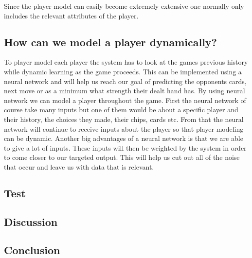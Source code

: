 Since the player model can easily become extremely extensive one normally only includes the relevant attributes of the player.

\subsection{How can we model a player dynamically?}
To player model each player the system has to look at the games previous history while dynamic learning as the game proceeds.
This can be implemented using a neural network and will help us reach our goal of predicting the opponents cards, next move or as a minimum what strength their dealt hand has. By using neural network we can model a player throughout the game. First the neural network of course take many inputs but one of them would be about a specific player and their history, the choices they made, their chips, cards etc. From that the neural network will continue to receive inputs about the player so that player modeling can be dynamic.
Another big advantages of a neural network is that we are able to give a lot of inputs. These inputs will then be weighted by the system in order to come closer to our targeted output.
This will help us cut out all of the noise that occur and leave us with data that is relevant.

\subsection{Test}


\subsection{Discussion}

\subsection{Conclusion}